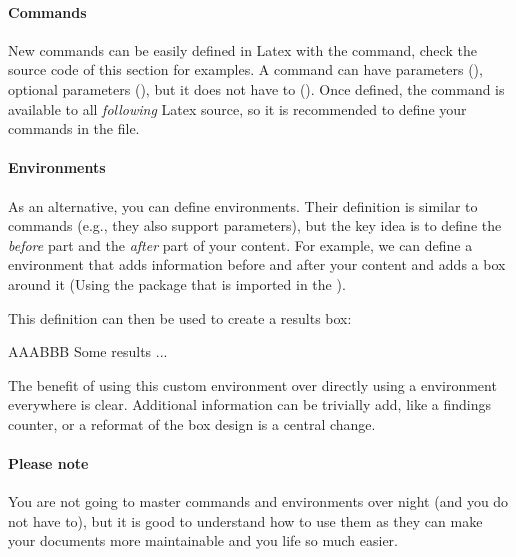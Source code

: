\paragraph{Commands}


New commands can be easily defined in Latex with the  command, check the source code of this section for examples.
A command can have parameters (), optional parameters (), but it does not have to (\noparams{}).
Once defined, the command is available to all \emph{following} Latex source, so it is recommended to define your commands in the  file.


\paragraph{Environments}

As an alternative, you can define environments.
Their definition is similar to commands (e.g., they also support parameters), but the key idea is to define the \emph{before} part and the \emph{after} part of your content.
For example, we can define a  environment that adds information before and after your content and adds a box around it (Using the  package that is imported in the ).

%
{\begin{framed} \noindent #1}
{#2 \end{framed}}

This definition can then be used to create a results box:

\begin{resultBox}{AAA}{BBB}
Some results ...
\end{resultBox}

The benefit of using this custom environment over directly using a  environment everywhere is clear.
Additional information can be trivially add, like a findings counter, or a reformat of the box design is a central change.

\paragraph{Please note} You are not going to master commands and environments over night (and you do not have to), but it is good to understand how to use them as they can make your documents more maintainable and you life so much easier.
